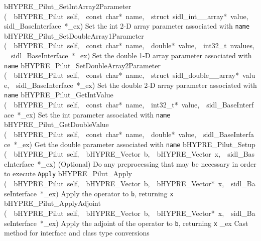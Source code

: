 \documentclass{article}
\begin{document}
\begin{cxxentry}
\begin{cxxentry}
\begin{cxxnames}
        {bHYPRE\_Pilut\_SetIntArray2Parameter}
        {(\ \ bHYPRE\_Pilut\ self,\ \ const\ char*\ name,\ \ struct\ sidl\_int\_\_array*\ value,\ \ sidl\_BaseInterface\ *\_ex)}
        {
Set the int 2-D array parameter associated with {\tt name}}
        {}
\label{cxx.6.6.21}
        {bHYPRE\_Pilut\_SetDoubleArray1Parameter}
        {(\ \ bHYPRE\_Pilut\ self,\ \ const\ char*\ name,\ \ double*\ value,\ \ int32\_t\ nvalues,\ \ sidl\_BaseInterface\ *\_ex)}
        {
Set the double 1-D array parameter associated with {\tt name}}
        {}
\label{cxx.6.6.22}
        {bHYPRE\_Pilut\_SetDoubleArray2Parameter}
        {(\ \ bHYPRE\_Pilut\ self,\ \ const\ char*\ name,\ \ struct\ sidl\_double\_\_array*\ value,\ \ sidl\_BaseInterface\ *\_ex)}
        {
Set the double 2-D array parameter associated with {\tt name}}
        {}
\label{cxx.6.6.23}
        {bHYPRE\_Pilut\_GetIntValue}
        {(\ \ bHYPRE\_Pilut\ self,\ \ const\ char*\ name,\ \ int32\_t*\ value,\ \ sidl\_BaseInterface\ *\_ex)}
        {
Set the int parameter associated with {\tt name}}
        {}
\label{cxx.6.6.24}
        {bHYPRE\_Pilut\_GetDoubleValue}
        {(\ \ bHYPRE\_Pilut\ self,\ \ const\ char*\ name,\ \ double*\ value,\ \ sidl\_BaseInterface\ *\_ex)}
        {
Get the double parameter associated with {\tt name}}
        {}
\label{cxx.6.6.25}
        {bHYPRE\_Pilut\_Setup}
        {(\ \ bHYPRE\_Pilut\ self,\ \ bHYPRE\_Vector\ b,\ \ bHYPRE\_Vector\ x,\ \ sidl\_BaseInterface\ *\_ex)}
        {
(Optional) Do any preprocessing that may be necessary in
order to execute {\tt Apply}}
        {}
\label{cxx.6.6.26}
        {bHYPRE\_Pilut\_Apply}
        {(\ \ bHYPRE\_Pilut\ self,\ \ bHYPRE\_Vector\ b,\ \ bHYPRE\_Vector*\ x,\ \ sidl\_BaseInterface\ *\_ex)}
        {
Apply the operator to {\tt b}, returning {\tt x}}
        {}
\label{cxx.6.6.27}
        {bHYPRE\_Pilut\_ApplyAdjoint}
        {(\ \ bHYPRE\_Pilut\ self,\ \ bHYPRE\_Vector\ b,\ \ bHYPRE\_Vector*\ x,\ \ sidl\_BaseInterface\ *\_ex)}
        {
Apply the adjoint of the operator to {\tt b}, returning {\tt x}}
        {}
\label{cxx.6.6.28}
        {\_ex}
        {}
        {
Cast method for interface and class type conversions}

\end{cxxnames}
\end{cxxentry}
\end{cxxentry}
\end{document}
